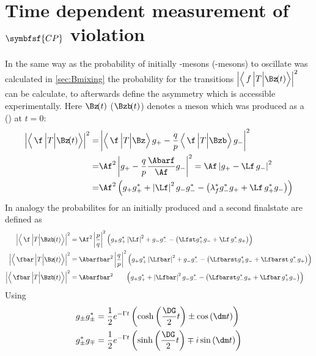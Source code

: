 \section[head={Time dependent measurement of \CP violation},tocentry={Time dependent measurement of \CP violation}]
{Time dependent measurement of $\symbfsf{C{}P}$ violation}
\label{sec:TimeDependentCPV}

In the same way as the probability of initially \B-mesons (\Bzb-mesons) to oscillate was calculated in \cref{sec:Bmixing} the
probability for the transitions $\left|\left<\,f\,\Big|T\Big|\Bz\!(t)\right>\right|^2$ can be calculate, to afterwards define the
\CP asymmetry which is accessible experimentally. Here $\Bz\!(t)$ ($\Bzb\!(t)$) denotes a \B meson which was produced as a \Bz
(\Bzb) at $t=0$:
\begin{align}
\left|\left<\,\f\,\Big|T\Big|\Bz\!(t)\right>\right|^2 =&
\left|\left<\,\f\,\Big|T\Big|\Bz\right>g_+-\frac{q}{p}\left<\,\f\,\Big|T\Big|\Bzb\right>g_-\right|^2\nonumber\\
=&\Af^2\left|g_+ - \frac{q}{p}\frac{\Abarf}{\Af} g_-\right|^2=\Af\left|g_+ -\Lf\,g_-\right|^2\nonumber\\
=&\Af^2\left(g_+g_+^*+\left|\Lf\right|^2g_-g_-^*-\left(\lambda_{f}^*g_-^*g_+ + \Lf\,g_+^* g_-\right)\right)
\end{align}
In analogy the probabilites for an initially produced \Bzb and a second finalstate \fbar are defined as
\begin{align}
\left|\left<\,\f\,\Big|T\Big|\Bzb\!(t)\right>\right|^2 &=
\Af^2\left|\frac{p}{q}\right|^2\left(g_+g_+^*\left|\Lf\right|^2+g_-g_-^*-\left(\Lfst g_+^*g_- + \Lf\,g_-^* g_+\right)\right)\\
\left|\left<\,\fbar\,\Big|T\Big|\Bz\!(t)\right>\right|^2 &=
\Abarfbar^2\left|\frac{q}{p}\right|^2\left(g_+g_+^*\left|\Lfbar\right|^2+g_-g_-^*-\left(\Lfbarst g_+^*g_- + \Lfbarst\,g_-^* g_+\right)\right)\\
\left|\left<\,\fbar\,\Big|T\Big|\Bzb\!(t)\right>\right|^2 &=
\Abarfbar^2\hphantom{\left|\frac{q}{p}\right|^2}\left(g_+g_+^*+\left|\Lfbar\right|^2g_-g_-^*-\left(\Lfbarst g_-^*g_+ + \Lfbar\,g_+^* g_-\right)\right)
\end{align}
Using
\begin{align}
g_{\pm}g_{\pm}^{*} &= \frac{1}{2}e^{-\Gamma t}\left(\cosh\left(\frac{\DG}{2}t\right)\pm\cos\left(\dm t\right)\right)\\
g_{\pm}^*g_{\mp} &=  \frac{1}{2}e^{-\Gamma t}\left(\sinh\left(\frac{\DG}{2}t\right)\mp i\sin\left(\dm t\right)\right)
\end{align}
